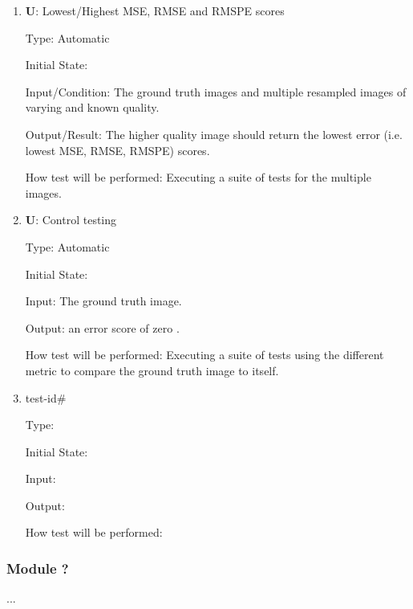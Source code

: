 \documentclass[12pt, titlepage]{article}
\newcounter{testnum} %
\newcounter{unittestnum} %
\begin{document}
\begin{enumerate}

\item{\textbf{U\theunittestnum \label{U_metric1}}: Lowest/Highest MSE, RMSE and RMSPE scores\\}

Type: Automatic
					
Initial State: 
					
Input/Condition: The ground truth images and multiple resampled images of varying and known quality.
					
Output/Result: The higher quality image should return the lowest error (i.e. lowest MSE, RMSE, RMSPE) scores.
					
How test will be performed: Executing a suite of tests for the multiple images.
					
\item{\textbf{U\theunittestnum \label{U_metricControl}}: Control testing \\}

Type: Automatic
					
Initial State: 
					
Input: The ground truth image.
					
Output: an error score of zero .
					
How test will be performed: Executing a suite of tests using the different metric to compare the 
ground truth image to itself.
					
\item{test-id\#\\}

Type: 
					
Initial State: 
					
Input: 
					
Output: 
					
How test will be performed: 

\end{enumerate}

\subsubsection{Module ?}

...

\newpage
\clearpage
\end{document}
